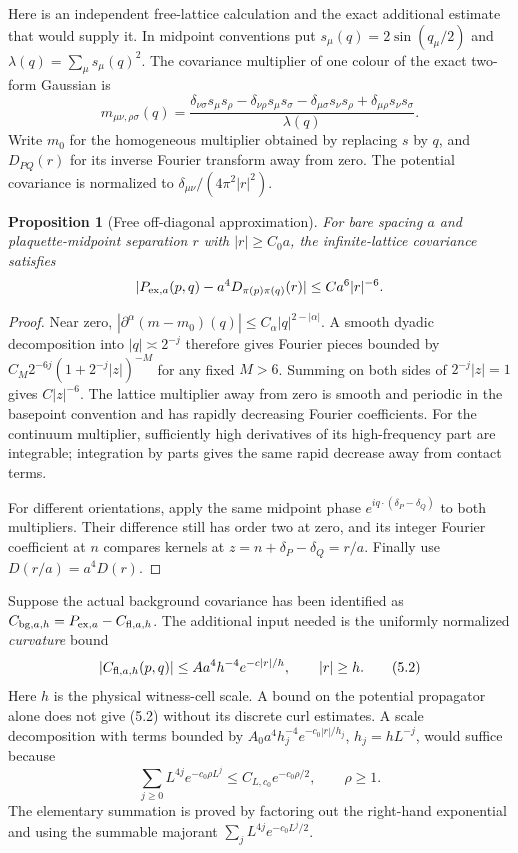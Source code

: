 \documentclass[11pt]{article}
\newtheorem{proposition}{Proposition}[section]
\theoremstyle{remark}
\begin{document}
Here is an independent free-lattice calculation and the exact
additional estimate that would supply it. In midpoint conventions put
$s_\mu(q)=2\sin(q_\mu/2)$ and $\lambda(q)=\sum_\mu s_\mu(q)^2$.
The covariance multiplier of one colour of the exact two-form Gaussian is
\[
 m_{\mu\nu,\rho\sigma}(q)=
 \frac{\delta_{\nu\sigma}s_\mu s_\rho-
 \delta_{\nu\rho}s_\mu s_\sigma-
 \delta_{\mu\sigma}s_\nu s_\rho+
 \delta_{\mu\rho}s_\nu s_\sigma}{\lambda(q)}.
\]
Write $m_0$ for the homogeneous multiplier obtained by replacing $s$ by
$q$, and $D_{PQ}(r)$ for its inverse Fourier transform away from zero.
The potential covariance is normalized to
$\delta_{\mu\nu}/(4\pi^2|r|^2)$.

\begin{proposition}[Free off-diagonal approximation]
For bare spacing $a$ and plaquette-midpoint separation $r$ with
$|r|\geq C_0a$, the infinite-lattice covariance satisfies
\[
 |P_{{\rm ex},a}(p,q)-a^4D_{\pi(p)\pi(q)}(r)|
 \leq Ca^6|r|^{-6}.
\]
\end{proposition}
\begin{proof}
Near zero,
$|\partial^\alpha(m-m_0)(q)|\leq C_\alpha|q|^{2-|\alpha|}$.
A smooth dyadic decomposition into $|q|\asymp2^{-j}$ therefore gives
Fourier pieces bounded by
$C_M2^{-6j}(1+2^{-j}|z|)^{-M}$ for any fixed $M>6$.
Summing on both sides of $2^{-j}|z|=1$ gives $C|z|^{-6}$.
The lattice multiplier away from zero is smooth and periodic in the
basepoint convention and has rapidly decreasing Fourier coefficients.
For the continuum multiplier, sufficiently high derivatives of its
high-frequency part are integrable; integration by parts gives the
same rapid decrease away from contact terms.

For different orientations, apply the same midpoint phase
$e^{iq\cdot(\delta_P-\delta_Q)}$ to both multipliers. Their difference
still has order two at zero, and its integer Fourier coefficient at
$n$ compares kernels at $z=n+\delta_P-\delta_Q=r/a$.
Finally use $D(r/a)=a^4D(r)$.
\end{proof}

Suppose the actual background covariance has been identified as
$C_{{\rm bg},a,h}=P_{{\rm ex},a}-C_{{\rm fl},a,h}$.
The additional input needed is the uniformly normalized
\emph{curvature} bound
\[
 |C_{{\rm fl},a,h}(p,q)|
 \leq Aa^4h^{-4}e^{-c|r|/h},\qquad |r|\geq h.
 \tag{5.2}
\]
Here $h$ is the physical witness-cell scale. A bound on the potential
propagator alone does not give (5.2) without its discrete curl estimates.
A scale decomposition with terms bounded by
$A_0a^4h_j^{-4}e^{-c_0|r|/h_j}$, $h_j=hL^{-j}$, would suffice because
\[
 \sum_{j\geq0}L^{4j}e^{-c_0\rho L^j}
 \leq C_{L,c_0}e^{-c_0\rho/2},\qquad \rho\geq1.
\]
The elementary summation is proved by factoring out the right-hand
exponential and using the summable majorant
$\sum_jL^{4j}e^{-c_0L^j/2}$.
\end{document}
